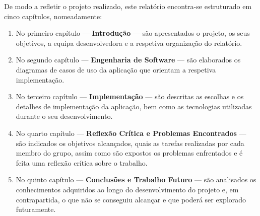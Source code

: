 De modo a refletir o projeto realizado, este relatório encontra-se estruturado em cinco capítulos, nomeadamente:

\begin{enumerate}
\item No primeiro capítulo --- \textbf{Introdução} --- são apresentados o projeto, os seus objetivos, a equipa desenvolvedora e a respetiva organização do relatório.

\item No segundo capítulo --- \textbf{Engenharia de Software} --- são elaborados os diagramas de casos de uso da aplicação que orientam a respetiva implementação.

\item No terceiro capítulo --- \textbf{Implementação} --- são descritas as escolhas e os detalhes de implementação da aplicação, bem como as tecnologias utilizadas durante o seu desenvolvimento.

\item No quarto capítulo --- \textbf{Reflexão Crítica e Problemas Encontrados} --- são indicados os objetivos alcançados, quais as tarefas realizadas por cada membro do grupo, assim como são expostos os problemas enfrentados e é feita uma reflexão crítica sobre o trabalho.

\item No quinto capítulo --- \textbf{Conclusões e Trabalho Futuro} --- são analisados os conhecimentos adquiridos ao longo do desenvolvimento do projeto e, em contrapartida, o que não se conseguiu alcançar e que poderá ser explorado futuramente.
\end{enumerate}
